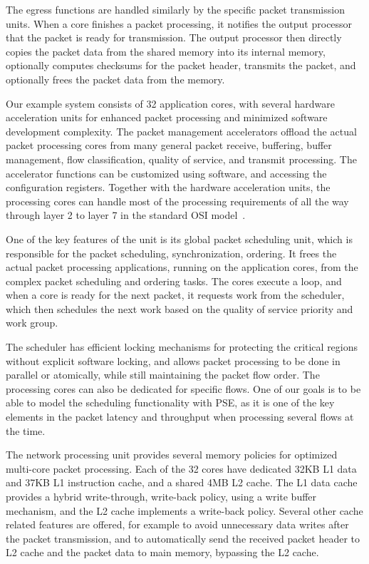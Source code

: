 The egress functions are handled similarly by the specific packet transmission units. When a core finishes a packet processing, it notifies the output processor that the packet is ready for transmission. The output processor then directly copies the packet data from the shared memory into its internal memory, optionally computes checksums for the packet header, transmits the packet, and optionally frees the packet data from the memory.

Our example system consists of 32 application cores, with several hardware acceleration units for enhanced packet processing and minimized software development complexity. The packet management accelerators offload the actual packet processing cores from many general packet receive, buffering, buffer management, flow classification, quality of service, and transmit processing. The accelerator functions can be customized using software, and accessing the configuration registers. Together with the hardware acceleration units, the processing cores can handle most of the processing requirements of all the way through layer 2 to layer 7 in the standard OSI model~\cite{ISO:1994:OSI}.

One of the key features of the unit is its global packet scheduling unit, which is responsible for the packet scheduling, synchronization, ordering. It frees the actual packet processing applications, running on the application cores, from the complex packet scheduling and ordering tasks. The cores execute a loop, and when a core is ready for the next packet, it requests work from the scheduler, which then schedules the next work based on the quality of service priority and work group.

The scheduler has efficient locking mechanisms for protecting the critical regions without explicit software locking, and allows packet processing to be done in parallel or atomically, while still maintaining the packet flow order. The processing cores can also be dedicated for specific flows. One of our goals is to be able to model the scheduling functionality with PSE, as it is one of the key elements in the packet latency and throughput when processing several flows at the time.


The network processing unit provides several memory policies for optimized multi-core packet processing. Each of the 32 cores have dedicated 32KB L1 data and 37KB L1 instruction cache, and a shared 4MB L2 cache. The L1 data cache provides a hybrid write-through, write-back policy, using a write buffer mechanism, and the L2 cache implements a write-back policy. Several other cache related features are offered, for example to avoid unnecessary data writes after the packet transmission, and to automatically send the received packet header to L2 cache and the packet data to main memory, bypassing the L2 cache.

